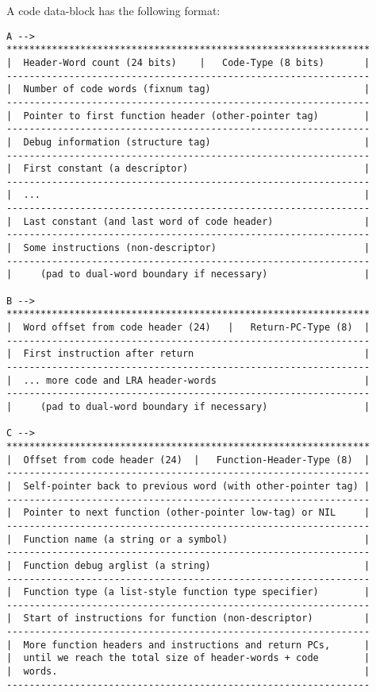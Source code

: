 A code data-block has the following format:
\begin{verbatim}
A -->
****************************************************************
|  Header-Word count (24 bits)    |   Code-Type (8 bits)       |
----------------------------------------------------------------
|  Number of code words (fixnum tag)                           |
----------------------------------------------------------------
|  Pointer to first function header (other-pointer tag)        |
----------------------------------------------------------------
|  Debug information (structure tag)                           |
----------------------------------------------------------------
|  First constant (a descriptor)                               |
----------------------------------------------------------------
|  ...                                                         |
----------------------------------------------------------------
|  Last constant (and last word of code header)                |
----------------------------------------------------------------
|  Some instructions (non-descriptor)                          |
----------------------------------------------------------------
|     (pad to dual-word boundary if necessary)                 |

B -->
****************************************************************
|  Word offset from code header (24)   |   Return-PC-Type (8)  |
----------------------------------------------------------------
|  First instruction after return                              |
----------------------------------------------------------------
|  ... more code and LRA header-words                          |
----------------------------------------------------------------
|     (pad to dual-word boundary if necessary)                 |

C -->
****************************************************************
|  Offset from code header (24)  |   Function-Header-Type (8)  |
----------------------------------------------------------------
|  Self-pointer back to previous word (with other-pointer tag) |
----------------------------------------------------------------
|  Pointer to next function (other-pointer low-tag) or NIL     |
----------------------------------------------------------------
|  Function name (a string or a symbol)                        |
----------------------------------------------------------------
|  Function debug arglist (a string)                           |
----------------------------------------------------------------
|  Function type (a list-style function type specifier)        |
----------------------------------------------------------------
|  Start of instructions for function (non-descriptor)         |
----------------------------------------------------------------
|  More function headers and instructions and return PCs,      |
|  until we reach the total size of header-words + code        |
|  words.                                                      |
----------------------------------------------------------------
\end{verbatim}

